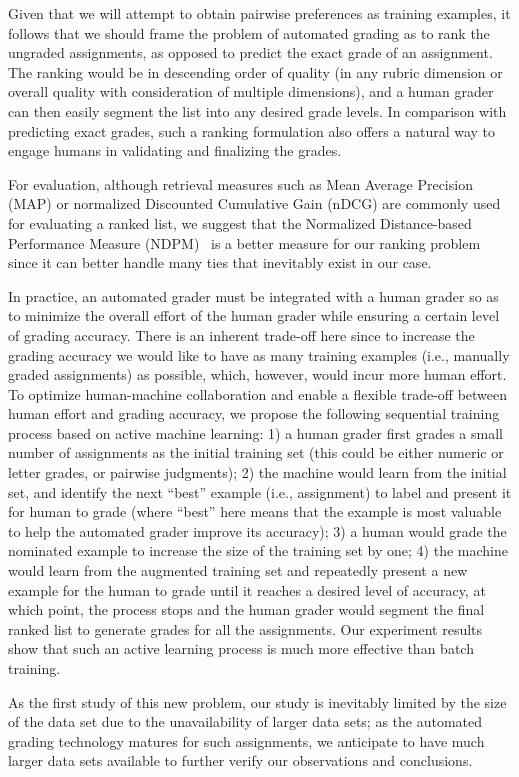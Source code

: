 Given that we will attempt to obtain pairwise preferences as training
examples, it follows that we should frame the problem of automated grading
as to rank the ungraded assignments, as opposed to predict the exact grade
of an assignment. The ranking would be in descending order of quality (in
any rubric dimension or overall quality with consideration of multiple
dimensions), and a human grader can  then easily segment the list into any
desired grade levels.  In comparison with predicting exact grades, such a
ranking formulation also offers a natural way to engage humans in
validating and finalizing the grades.

For evaluation, although retrieval measures such as Mean Average Precision
(MAP) or normalized Discounted Cumulative Gain (nDCG) are commonly used for
evaluating a ranked list, we suggest that the Normalized Distance-based
Performance Measure (NDPM)~\cite{Yao:1995:JASIS} is a better measure for
our ranking problem since it can better handle many ties that inevitably
exist in our case.

In practice, an automated grader must be integrated with a human grader so
as to minimize the overall effort of the human grader while ensuring a
certain level of grading accuracy. There is an inherent trade-off here since
to increase the grading accuracy we would like to have as many training
examples (i.e., manually graded assignments) as possible, which, however,
would incur more human effort. To optimize human-machine collaboration and
enable a flexible trade-off between human effort and grading accuracy, we
propose the following sequential training process based on active machine
learning: 1) a human grader first grades a small number of assignments as
the initial training set (this could be either numeric or letter grades, or
pairwise judgments); 2) the machine would learn from the initial set,
and identify the next ``best'' example (i.e., assignment) to label and
present it for human to grade (where ``best'' here means that the example
is most valuable to help the automated grader improve its accuracy); 3)
a human would grade the nominated example to increase the size of the
training set by one; 4) the machine would learn from the augmented training
set and repeatedly present a new example for the human to grade until it
reaches a desired level of accuracy, at which point, the process stops and
the human grader would segment the final ranked list to generate grades for
all the assignments. Our experiment results show that such an active
learning process is much more effective than batch training.

As the first study of this new problem, our study is inevitably limited by
the size of the data set due to the unavailability of larger data sets; as
the automated grading technology matures for such assignments, we
anticipate to have much larger data sets available to further verify our
observations and conclusions.

